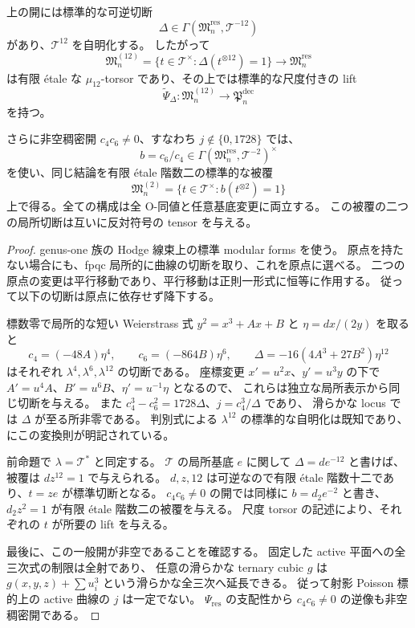 \begin{theorem}
\label{thm:nfm-modular-scale-covers}
上の開には標準的な可逆切断
\[
 \Delta\in\Gamma(\mathfrak M_n^{\mathrm{res}},\mathscr T^{-12})
\]
があり、$\mathscr T^{12}$ を自明化する。
したがって
\[
 \mathfrak M_n^{(12)}
   =\{t\in\mathscr T^\times:\Delta(t^{\otimes12})=1\}
   \longrightarrow\mathfrak M_n^{\mathrm{res}}
\]
は有限 étale な $\mu_{12}$-torsor であり、その上では標準的な尺度付きの lift
\[
 \widetilde\Psi_{\Delta}:
 \mathfrak M_n^{(12)}\longrightarrow\mathfrak P_n^{\mathrm{dec}}
\]
を持つ。

さらに非空稠密開 $c_4c_6\ne0$、すなわち $j\notin\{0,1728\}$ では、
\[
 b=c_6/c_4\in\Gamma(\mathfrak M_n^{\mathrm{res}},\mathscr T^{-2})^\times
\]
を使い、同じ結論を有限 étale 階数二の標準的な被覆
\[
 \mathfrak M_n^{(2)}
   =\{t\in\mathscr T^\times:b(t^{\otimes2})=1\}
\]
上で得る。全ての構成は全 O-同値と任意基底変更に両立する。
この被覆の二つの局所切断は互いに反対符号の tensor を与える。
\end{theorem}

\begin{proof}
genus-one 族の Hodge 線束上の標準 modular forms を使う。
原点を持たない場合にも、fpqc 局所的に曲線の切断を取り、これを原点に選べる。
二つの原点の変更は平行移動であり、平行移動は正則一形式に恒等に作用する。
従って以下の切断は原点に依存せず降下する。

標数零で局所的な短い Weierstrass 式
$y^2=x^3+Ax+B$ と $\eta=dx/(2y)$ を取ると
\[
 c_4=(-48A)\eta^4,\qquad
 c_6=(-864B)\eta^6,\qquad
 \Delta=-16(4A^3+27B^2)\eta^{12}
\]
はそれぞれ $\lambda^4,\lambda^6,\lambda^{12}$ の切断である。
座標変更 $x'=u^2x$、$y'=u^3y$ の下で
$A'=u^4A$、$B'=u^6B$、$\eta'=u^{-1}\eta$ となるので、
これらは独立な局所表示から同じ切断を与える。
また $c_4^3-c_6^2=1728\Delta$、$j=c_4^3/\Delta$ であり、
滑らかな locus では $\Delta$ が至る所非零である。
判別式による $\lambda^{12}$ の標準的な自明化は既知であり、
\cite[Section~1, equations~(1-1)--(1-5), pp.~87--88]{NFMFultonOlsson}
にこの変換則が明記されている。

前命題で $\lambda=\mathscr T^*$ と同定する。
$\mathscr T$ の局所基底 $e$ に関して $\Delta=d e^{-12}$ と書けば、
被覆は $dz^{12}=1$ で与えられる。
$d,z,12$ は可逆なので有限 étale 階数十二であり、$t=ze$ が標準切断となる。
$c_4c_6\ne0$ の開では同様に $b=d_2e^{-2}$ と書き、
$d_2z^2=1$ が有限 étale 階数二の被覆を与える。
尺度 torsor の記述により、それぞれの $t$ が所要の lift を与える。

最後に、この一般開が非空であることを確認する。
固定した active 平面への全三次式の制限は全射であり、
任意の滑らかな ternary cubic $g$ は
$g(x,y,z)+\sum u_i^3$ という滑らかな全三次へ延長できる。
従って射影 Poisson 標的上の active 曲線の $j$ は一定でない。
$\Psi_{\mathrm{res}}$ の支配性から $c_4c_6\ne0$ の逆像も非空稠密開である。
\end{proof}

